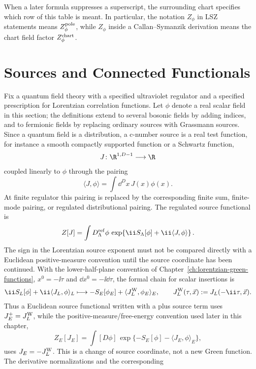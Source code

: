 When a later formula suppresses a superscript, the surrounding chart specifies
which row of this table is meant.  In particular, the notation \(Z_\phi\) in
LSZ statements means \(Z_\phi^{\rm pole}\), while \(Z_\phi\) inside a
Callan--Symanzik derivation means the chart field factor
\(Z_\phi^{\rm chart}\).

\section{Sources and Connected Functionals}

\begin{definition}
\label{def:regulated-scalar-source-functional}
Fix a quantum field theory with a specified ultraviolet regulator and a
specified prescription for Lorentzian correlation functions.  Let \(\phi\)
denote a real scalar field in this section; the definitions extend to several
bosonic fields by adding indices, and to fermionic fields by replacing ordinary
sources with Grassmann sources.  Since a quantum field is a distribution, a
c-number source is a real test function, for instance a smooth compactly
supported function or a Schwartz function,
\[
  J\colon \R^{1,D-1}\longrightarrow \R
\]
coupled linearly to \(\phi\) through the pairing
\[
  \langle J,\phi\rangle
  =
  \int \dd^Dx\,J(x)\phi(x).
\]
At finite regulator this pairing is replaced by the corresponding finite
sum, finite-mode pairing, or regulated distributional pairing.  The regulated
source functional is
\[
  Z[J]
  =
  \int D_\Lambda^{\rm ref}\phi\,
  \exp\!\left\{
    \ii S_{\Lambda}[\phi]
    +\ii\langle J,\phi\rangle
  \right\}.
\]
The sign in the Lorentzian source exponent must not be compared directly with
a Euclidean positive-measure convention until the source coordinate has been
continued.  With the lower-half-plane convention of
Chapter~\ref{ch:lorentzian-green-functions}, \(x^0=-\ii\tau\) and
\(\dd x^0=-\ii\dd\tau\), the formal chain for scalar insertions is
\[
  \ii S_L[\phi]+\ii\langle J_L,\phi\rangle_L
  \longmapsto
  -S_E[\phi_E]
  +\langle J_L^{\rm W},\phi_E\rangle_E,
  \qquad
  J_L^{\rm W}(\tau,\vec x):=J_L(-\ii\tau,\vec x).
\]
Thus a Euclidean source functional written with a plus source term uses
\(J_E^{+}=J_L^{\rm W}\), while the positive-measure/free-energy convention
used later in this chapter,
\[
  Z_E[J_E]=\int[D\phi]\,
  \exp\{-S_E[\phi]-\langle J_E,\phi\rangle_E\},
\]
uses \(J_E=-J_L^{\rm W}\).  This is a change of source coordinate, not a new
Green function.  The derivative normalizations and the corresponding

\end{definition}
